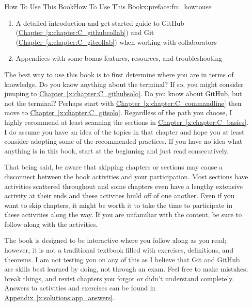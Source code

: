 \documentclass[oneside,10pt,]{book}
\newcommand{\xreffont}{\relax}
\begin{document}
\begin{preface}{How To Use This Book}{}{How To Use This Book}{}{}{x:preface:fm_howtouse}
\begin{enumerate}
\item{}A detailed introduction and get-started guide to GitHub (\hyperref[x:chapter:C_githubcollab]{Chapter~{\xreffont\ref{x:chapter:C_githubcollab}}}) and Git (\hyperref[x:chapter:C_gitcollab]{Chapter~{\xreffont\ref{x:chapter:C_gitcollab}}}) when working with collaborators%
\item{}Appendices with some bonus features, resources, and troubleshooting%
\end{enumerate}
%
\par
The best way to use this book is to first determine where you are in terms of knowledge. Do you know anything about the terminal? If so, you might consider jumping to \hyperref[x:chapter:C_githubsolo]{Chapter~{\xreffont\ref{x:chapter:C_githubsolo}}}. Do you know about GitHub, but not the terminal? Perhaps start with \hyperref[x:chapter:C_commandline]{Chapter~{\xreffont\ref{x:chapter:C_commandline}}} then move to \hyperref[x:chapter:C_gitsolo]{Chapter~{\xreffont\ref{x:chapter:C_gitsolo}}}. Regardless of the path you choose, I highly recommend at least scanning the sections in \hyperref[x:chapter:C_basics]{Chapter~{\xreffont\ref{x:chapter:C_basics}}}. I do assume you have an idea of the topics in that chapter and hope you at least consider adopting some of the recommended practices. If you have no idea what anything is in this book, start at the beginning and just read consecutively.%
\par
That being said, be aware that skipping chapters or sections may cause a disconnect between the book activities and your participation. Most sections have activities scattered throughout and some chapters even have a lengthy extensive activity at their ends and these activites build off of one another. Even if you want to skip chapters, it might be worth it to take the time to participate in these activities along the way. If you are unfamiliar with the content, be sure to follow along with the activities.%
\par
The book is designed to be interactive where you follow along as you read; however, it is not a traditional textbook filled with exercises, definitions, and theorems. I am not testing you on any of this as I believe that Git and GitHub are skills best learned by doing, not through an exam. Feel free to make mistakes, break things, and revist chapters you forgot or didn't understand completely. Answers to activities and exercises can be found in \hyperref[x:solutions:app_answers]{Appendix~{\xreffont\ref{x:solutions:app_answers}}}.%
\par

\end{preface}
\end{document}
